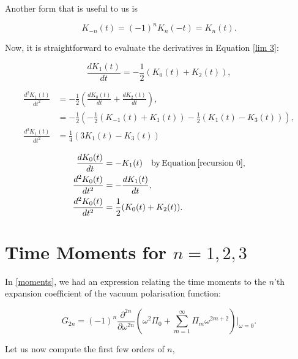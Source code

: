 \documentclass{article}
\numberwithin{equation}{section} %
\begin{document}
Another form that is useful to us is

\begin{equation}
K_{-n}(t) = (-1)^nK_n(-t) = K_n(t).
\label{recursion 0}
\end{equation}

Now, it is straightforward to evaluate the derivatives in Equation \ref{lim 3}:

\begin{equation}
\frac{dK_1(t)}{dt} = -\frac{1}{2}(K_0(t)+K_2(t)),
\label{recursion 1}
\end{equation}

\begin{equation}
\begin{split}
\frac{d^2K_1(t)}{dt^2}&= -\frac{1}{2}\left( \frac{dK_0(t)}{dt} + \frac{dK_2(t)}{dt}\right),\\
&=-\frac{1}{2}\left( -\frac{1}{2}(K_{-1}(t)+K_1(t)) - \frac{1}{2}(K_1(t)-K_3(t))\right),\\
\frac{d^2K_1(t)}{dt^2}&=\frac{1}{4}\left(3K_{1}(t) -K_3(t)\right)
\end{split}
\label{recursion 2}
\end{equation}

\begin{equation}
\begin{split}
\frac{dK_0(t)}{dt} &= -K_{1}(t) \quad \mathrm{by \, Equation \, \ref{recursion 0}},\\
\frac{d^2K_0(t)}{dt^2}&= -\frac{dK_{1}(t)}{dt},\\
\frac{d^2K_0(t)}{dt^2} &=\frac{1}{2}(K_0(t)+K_2(t)).
\end{split}
\label{recursion 3}
\end{equation}

\section{Time Moments for $n=1,2,3$}\label{time moments appendix}

In \ref{moments}, we had an expression relating the time moments to the $n$'th expansion coefficient of the vacuum polarisation function:

\begin{equation}
G_{2n}=  (-1)^{n} \frac{\partial^{2n}}{\partial \omega^{2n}} (\omega^2 \Pi_0 + \sum_{m=1}^\infty \Pi_m \omega^{2m+2})\bigg \vert_{\omega=0}.
\end{equation}


\noindent Let us now compute the first few orders of $n$,
\end{document}
